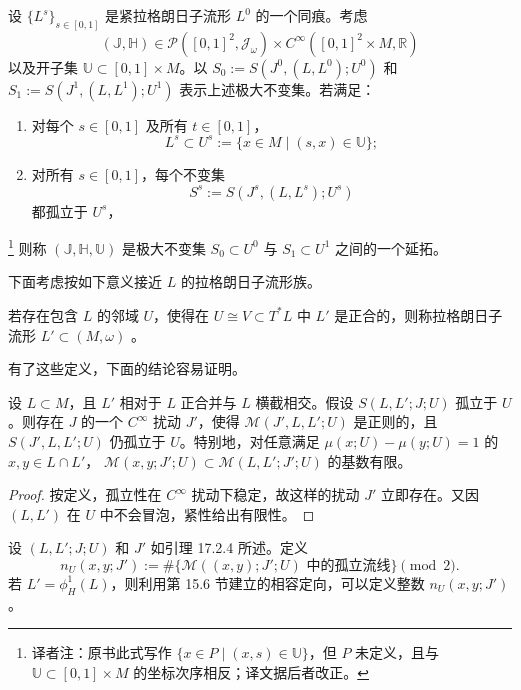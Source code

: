 \begin{definition}
\label{def:continuation-maximal-invariant-sets}
设 $\{L^s\}_{s\in[0,1]}$ 是紧拉格朗日子流形 $L^0$ 的一个同痕。考虑
\[
 (\mathbb J,\mathbb H)\in
 \mathcal P([0,1]^2,\mathcal J_\omega)
 \times C^\infty([0,1]^2\times M,\mathbb R)
\]
以及开子集 $\mathbb U\subset[0,1]\times M$。以
$S_0:=S(J^0,(L,L^0);U^0)$ 和
$S_1:=S(J^1,(L,L^1);U^1)$ 表示上述极大不变集。若满足：
\begin{enumerate}[label=(\arabic*)]
\item 对每个 $s\in[0,1]$ 及所有 $t\in[0,1]$，
\[
 L^s\subset U^s:=\{x\in M\mid(s,x)\in\mathbb U\};
\]
\item 对所有 $s\in[0,1]$，每个不变集
\[
 S^s:=S(J^s,(L,L^s);U^s)
\]
都孤立于 $U^s$，
\end{enumerate}
\footnote{译者注：原书此式写作 $\{x\in P\mid(x,s)\in\mathbb U\}$，但 $P$
未定义，且与 $\mathbb U\subset[0,1]\times M$ 的坐标次序相反；译文据后者改正。}
则称 $(\mathbb J,\mathbb H,\mathbb U)$ 是极大不变集
$S_0\subset U^0$ 与 $S_1\subset U^1$ 之间的一个延拓。
\end{definition}

下面考虑按如下意义接近 $L$ 的拉格朗日子流形族。

\begin{definition}
\label{def:exact-relative-to-L}
若存在包含 $L$ 的\personDarboux{}邻域 $U$，使得在
$U\cong V\subset T^*L$ 中 $L'$ 是正合的，则称拉格朗日子流形
$L'\subset(M,\omega)$ \termExactRelativeToL{}。
\end{definition}

有了这些定义，下面的结论容易证明。

\begin{lemma}
\label{lem:regular-perturbation-isolated-set}
设 $L\subset M$，且 $L'$ 相对于 $L$ 正合并与 $L$ 横截相交。假设
$S(L,L';J;U)$ 孤立于 $U$。则存在 $J$ 的一个 $C^\infty$ 扰动 $J'$，使得
$\mathcal M(J',L,L';U)$ 是\personFredholm{}正则的，且 $S(J',L,L';U)$ 仍孤立于
$U$。特别地，对任意满足 $\mu(x;U)-\mu(y;U)=1$ 的
$x,y\in L\cap L'$，
$\mathcal M(x,y;J';U)\subset\mathcal M(L,L';J';U)$ 的基数有限。
\end{lemma}

\begin{proof}
按定义，孤立性在 $C^\infty$ 扰动下稳定，故这样的扰动 $J'$ 立即存在。又因
$(L,L')$ 在 $U$ 中不会冒泡，紧性给出有限性。
\end{proof}

设 $(L,L';J;U)$ 和 $J'$ 如引理 17.2.4 所述。定义
\[
 n_U(x,y;J'):=\#\{\mathcal M((x,y);J';U)\text{ 中的孤立流线}\}\pmod2.
\]
若 $L'=\phi_H^1(L)$，则利用第 15.6 节建立的相容定向，可以定义整数
$n_U(x,y;J')$。

